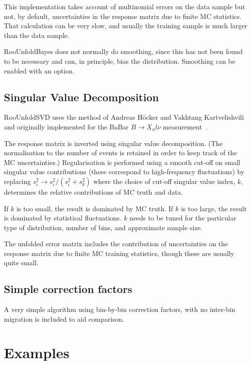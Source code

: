 \documentclass{desyproc}
\begin{document}
This implementation takes account of multinomial errors on the data sample but not,
by default, uncertainties in the response matrix due to finite MC statistics.
That calculation can be very slow, and usually the training sample is much larger
than the data sample.

RooUnfoldBayes does not normally do smoothing, since this has not been found to be necessary
and can, in principle, bias the distribution. Smoothing can be enabled with an option.

\subsection{Singular Value Decomposition}

RooUnfoldSVD uses the method of Andreas H\"ocker and Vakhtang Kartvelishvili~\cite{Hocker:1995kb}
and originally implemented for the BaBar $B \rightarrow X_ul\nu$ measurement~\cite{Aubert:2004bq}.

The response matrix is inverted using singular value decomposition.
(The normalisation to the number of events is retained in order to keep
track of the MC uncertainties.)
Regularisation is performed using a smooth cut-off on small singular value contributions
(these correspond to high-frequency fluctuations) by replacing
$s_i^2 \rightarrow s_i^2 / (s_i^2 + s_k^2)$ where the choice of cut-off singular value index, $k$,
determines the relative contributions of MC truth and data.

If $k$ is too small, the result is dominated by MC truth. 
If $k$ is too large, the result is dominated by statistical fluctuations.
$k$ needs to be tuned for the particular type of distribution, number of bins, and approximate sample size.

The unfolded error matrix includes the contribution of uncertainties on the
response matrix due to finite MC training statistics, though these are usually quite small.

\subsection{Simple correction factors}

A very simple algorithm using bin-by-bin correction factors,
with no inter-bin migration is included to aid comparison.

\section{Examples\label{sec:adye:examples}}
\end{document}
